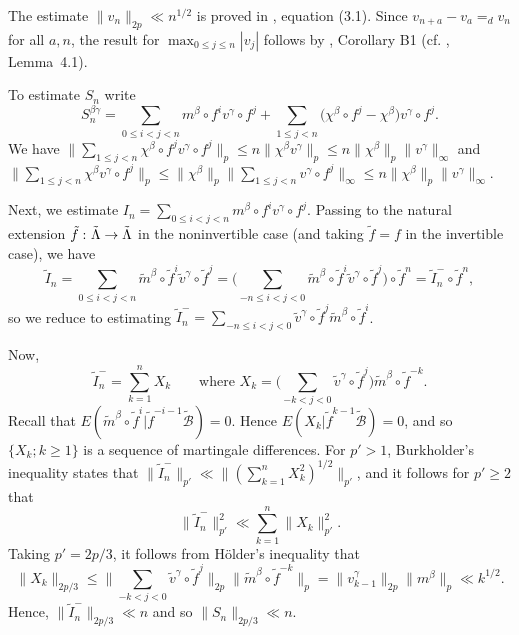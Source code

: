 \documentclass[aop,MSNbibl,seceqn,dvips]{arximspdf}
\begin{document}
\begin{pf}
The estimate $\|v_n\|_{2p}\ll n^{1/2}$ is proved in \cite{MN08},
equation (3.1).
Since $v_{n+a}-v_a=_d v_n$ for all $a,n$, the result for
$\max_{0\le j\le n}|v_j|$ follows by \cite{Serfling70}, Corollary B1
(cf. \cite{MTorok12}, Lemma~4.1).

To estimate $S_n$ write
%
\[
S_n^{\beta\gamma}= \sum_{0\le i<j<n}m^\beta
\circ f^i v^\gamma\circ f^j+ \sum
_{1\le j<n}\bigl(\chi^\beta\circ f^j-
\chi^\beta\bigr) v^\gamma\circ f^j.
\]
%
We have
$\|\sum_{1\le j<n}\chi^\beta\circ f^j v^\gamma\circ f^j\|_p\le
n\|\chi^\beta v^\gamma\|_p\le n\|\chi^\beta\|_p\|v^\gamma\|
_\infty$ and\break
$\|\sum_{1\le j<n}\chi^\beta v^\gamma\circ f^j\|_p\le
\|\chi^\beta\|_p
\|\sum_{1\le j<n}v^\gamma\circ f^j\|_\infty\le
n\|\chi^\beta\|_p\|v^\gamma\|_\infty$.

Next, we estimate
$I_n=\sum_{0\le i<j<n}m^\beta\circ f^i v^\gamma\circ f^j$.
Passing to the natural extension $\tilde f\dvtx\tilde\Lambda\to
\tilde\Lambda$
in the noninvertible case (and taking $\tilde f=f$ in the invertible case),
we have
%
\[
\tilde I_n=\sum_{0\le i<j<n}\tilde
m^\beta\circ\tilde f^i \tilde v^\gamma\circ\tilde
f^j= \biggl(\sum_{-n\le i<j<0} \tilde
m^\beta\circ\tilde f^i \tilde v^\gamma\circ\tilde
f^j \biggr)\circ\tilde f^n= \tilde I_n^-\circ
\tilde f^n,
\]
%
so we reduce to estimating
$\tilde I_n^-=\sum_{-n\le i<j<0} \tilde v^\gamma\circ\tilde f^j
\tilde
m^\beta\circ\tilde f^i$.

Now,
%
\[
\tilde I_n^-=\sum_{k=1}^n
X_k \qquad\mbox{where } X_k= \biggl(\sum
_{-k<j<0}\tilde v^\gamma\circ\tilde f^j
\biggr)\tilde m^\beta\circ\tilde f^{-k}.
\]
%
Recall that $E(\tilde m^\beta\circ\tilde f^i|\tilde f^{-i-1}\tilde
{\mathcal{B}})=0$.
Hence
$E(X_k|\tilde f^{k-1}\tilde{\mathcal{B}})=0$, and so
$\{X_k; k\ge1\}$ is a sequence of martingale differences.
For $p'>1$, Burkholder's inequality \cite{Burkholder73} states that
$\|\tilde I_n^-\|_{p'}
\ll\|(\sum_{k=1}^nX_k^2)^{1/2}\|_{p'}$,
and it follows for $p'\ge2$ that
%
\begin{equation}
\label{eq-Burk} \bigl\|\tilde I_n^-\bigr\|_{p'}^2 \ll
\sum_{k=1}^n\|X_k
\|_{p'}^2.
\end{equation}
%
Taking $p'=2p/3$, it follows from H\"older's inequality that
%
\[
\|X_k\|_{2p/3}\le \biggl\|\sum_{-k<j<0}
\tilde v^\gamma\circ\tilde f^j\biggr \|_{2p}\bigl\| \tilde
m^\beta\circ\tilde f^{-k}\bigr\|_p =
\bigl\|v^\gamma_{k-1}\bigr\|_{2p} \bigl\|m^\beta\bigr\|
_p\ll k^{1/2}.
\]
%
Hence, $\|\tilde I_n^-\|_{2p/3}\ll n$ and so
$\|S_n\|_{2p/3}\ll n$.


\end{pf}
\end{document}
